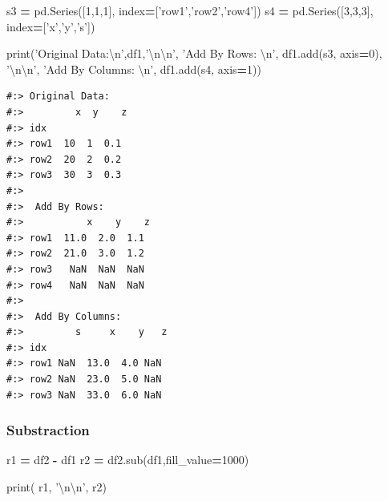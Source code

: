 \documentclass[
]{book}
\newenvironment{Shaded}{\begin{snugshade}}{\end{snugshade}}
\newcommand{\BuiltInTok}[1]{#1}
\newcommand{\CharTok}[1]{\textcolor[rgb]{0.5,0.5,0.5}{#1}}
\newcommand{\DecValTok}[1]{\textcolor[rgb]{0.06,0.06,0.06}{#1}}
\newcommand{\NormalTok}[1]{#1}
\newcommand{\OperatorTok}[1]{\textcolor[rgb]{0.43,0.43,0.43}{\textbf{#1}}}
\newcommand{\StringTok}[1]{\textcolor[rgb]{0.5,0.5,0.5}{#1}}
\begin{document}
\begin{Shaded}
\begin{Highlighting}[]
\NormalTok{s3 }\OperatorTok{=}\NormalTok{ pd.Series([}\DecValTok{1}\NormalTok{,}\DecValTok{1}\NormalTok{,}\DecValTok{1}\NormalTok{], index}\OperatorTok{=}\NormalTok{[}\StringTok{'row1'}\NormalTok{,}\StringTok{'row2'}\NormalTok{,}\StringTok{'row4'}\NormalTok{])}
\NormalTok{s4 }\OperatorTok{=}\NormalTok{ pd.Series([}\DecValTok{3}\NormalTok{,}\DecValTok{3}\NormalTok{,}\DecValTok{3}\NormalTok{], index}\OperatorTok{=}\NormalTok{[}\StringTok{'x'}\NormalTok{,}\StringTok{'y'}\NormalTok{,}\StringTok{'s'}\NormalTok{])}

\BuiltInTok{print}\NormalTok{(}\StringTok{'Original Data:}\CharTok{\textbackslash{}n}\StringTok{'}\NormalTok{,df1,}\StringTok{'}\CharTok{\textbackslash{}n\textbackslash{}n}\StringTok{'}\NormalTok{,}
      \StringTok{'Add By Rows: }\CharTok{\textbackslash{}n}\StringTok{'}\NormalTok{, df1.add(s3, axis}\OperatorTok{=}\DecValTok{0}\NormalTok{), }\StringTok{'}\CharTok{\textbackslash{}n\textbackslash{}n}\StringTok{'}\NormalTok{,}
      \StringTok{'Add By Columns: }\CharTok{\textbackslash{}n}\StringTok{'}\NormalTok{, df1.add(s4, axis}\OperatorTok{=}\DecValTok{1}\NormalTok{))}
\end{Highlighting}
\end{Shaded}

\begin{verbatim}
#:> Original Data:
#:>         x  y    z
#:> idx             
#:> row1  10  1  0.1
#:> row2  20  2  0.2
#:> row3  30  3  0.3 
#:> 
#:>  Add By Rows: 
#:>           x    y    z
#:> row1  11.0  2.0  1.1
#:> row2  21.0  3.0  1.2
#:> row3   NaN  NaN  NaN
#:> row4   NaN  NaN  NaN 
#:> 
#:>  Add By Columns: 
#:>         s     x    y   z
#:> idx                    
#:> row1 NaN  13.0  4.0 NaN
#:> row2 NaN  23.0  5.0 NaN
#:> row3 NaN  33.0  6.0 NaN
\end{verbatim}

\hypertarget{substraction}{%
\subsubsection{Substraction}\label{substraction}}

\begin{Shaded}
\begin{Highlighting}[]
\NormalTok{r1 }\OperatorTok{=}\NormalTok{ df2 }\OperatorTok{-}\NormalTok{ df1}
\NormalTok{r2 }\OperatorTok{=}\NormalTok{ df2.sub(df1,fill_value}\OperatorTok{=}\DecValTok{1000}\NormalTok{)}

\BuiltInTok{print}\NormalTok{( r1, }\StringTok{'}\CharTok{\textbackslash{}n\textbackslash{}n}\StringTok{'}\NormalTok{, r2)}
\end{Highlighting}
\end{Shaded}
\end{document}

